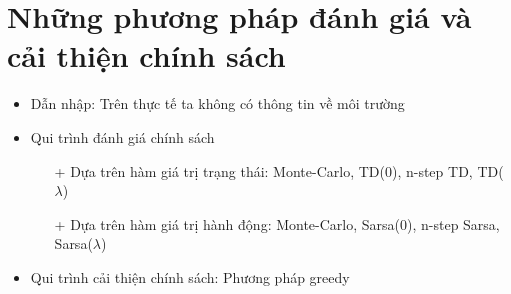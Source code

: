 \section{Những phương pháp đánh giá và cải thiện chính sách}
	\begin{itemize}
		\item Dẫn nhập: Trên thực tế ta không có thông tin về môi trường
		\item Qui trình đánh giá chính sách
			\begin{itemize}
				\item[+] Dựa trên hàm giá trị trạng thái: Monte-Carlo, TD(0), n-step TD, TD($\lambda$)
				\item[+] Dựa trên hàm giá trị hành động: Monte-Carlo, Sarsa(0), n-step Sarsa, Sarsa($\lambda$)
			\end{itemize}
		\item Qui trình cải thiện chính sách: Phương pháp greedy
	\end{itemize}
	
